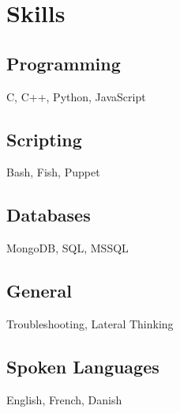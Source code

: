 \section{Skills}
\subsection{Programming}
C, C++, Python,  JavaScript
\sectionsep

\subsection{Scripting}
Bash, Fish, Puppet
\sectionsep

\subsection{Databases}
MongoDB, SQL, MSSQL
\sectionsep

\subsection{General}
Troubleshooting, Lateral Thinking
\sectionsep

\subsection{Spoken Languages}
English, French, Danish